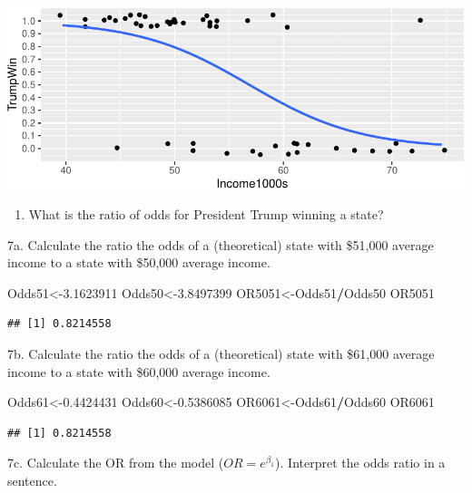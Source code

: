 \documentclass[]{article}
\newenvironment{Shaded}{\begin{snugshade}}{\end{snugshade}}
\newcommand{\FloatTok}[1]{\textcolor[rgb]{0.00,0.00,0.81}{#1}}
\newcommand{\NormalTok}[1]{#1}
\newcommand{\OperatorTok}[1]{\textcolor[rgb]{0.81,0.36,0.00}{\textbf{#1}}}
\providecommand{\tightlist}{%
  \setlength{\itemsep}{0pt}\setlength{\parskip}{0pt}}
\begin{document}
\includegraphics{17-class-exercise_answers_files/figure-latex/unnamed-chunk-8-1.pdf}

\begin{enumerate}
\def\labelenumi{\arabic{enumi}.}
\setcounter{enumi}{6}
\tightlist
\item
  What is the ratio of odds for President Trump winning a state?
\end{enumerate}

7a. Calculate the ratio the odds of a (theoretical) state with \$51,000
average income to a state with \$50,000 average income.

\begin{Shaded}
\begin{Highlighting}[]
\NormalTok{Odds51<-}\FloatTok{3.1623911}
\NormalTok{Odds50<-}\FloatTok{3.8497399}
\NormalTok{OR5051<-Odds51}\OperatorTok{/}\NormalTok{Odds50}
\NormalTok{OR5051}
\end{Highlighting}
\end{Shaded}

\begin{verbatim}
## [1] 0.8214558
\end{verbatim}

7b. Calculate the ratio the odds of a (theoretical) state with \$61,000
average income to a state with \$60,000 average income.

\begin{Shaded}
\begin{Highlighting}[]
\NormalTok{Odds61<-}\FloatTok{0.4424431}
\NormalTok{Odds60<-}\FloatTok{0.5386085}
\NormalTok{OR6061<-Odds61}\OperatorTok{/}\NormalTok{Odds60}
\NormalTok{OR6061}
\end{Highlighting}
\end{Shaded}

\begin{verbatim}
## [1] 0.8214558
\end{verbatim}

7c. Calculate the OR from the model (\(OR = e^{\beta_1}\)). Interpret
the odds ratio in a sentence.
\end{document}
